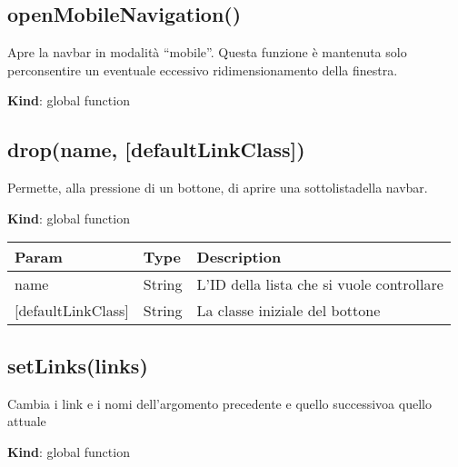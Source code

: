 \hypertarget{openmobilenavigation-1}{%
\subsection{openMobileNavigation()}\label{openmobilenavigation-1}}

Apre la navbar in modalità ``mobile''. Questa funzione è mantenuta solo
perconsentire un eventuale eccessivo ridimensionamento della finestra.

\textbf{Kind}: global function\\

\hypertarget{dropname-defaultlinkclass-1}{%
\subsection{drop(name,
{[}defaultLinkClass{]})}\label{dropname-defaultlinkclass-1}}

Permette, alla pressione di un bottone, di aprire una sottolistadella
navbar.

\textbf{Kind}: global function

\begin{longtable}[]{@{}lll@{}}
\toprule
Param & Type & Description\tabularnewline
\midrule
\endhead
name & String & L'ID della lista che si vuole controllare\tabularnewline
{[}defaultLinkClass{]} & String & La classe iniziale del
bottone\tabularnewline
\bottomrule
\end{longtable}

\hypertarget{setlinkslinks-1}{%
\subsection{setLinks(links)}\label{setlinkslinks-1}}

Cambia i link e i nomi dell'argomento precedente e quello successivoa
quello attuale

\textbf{Kind}: global function

